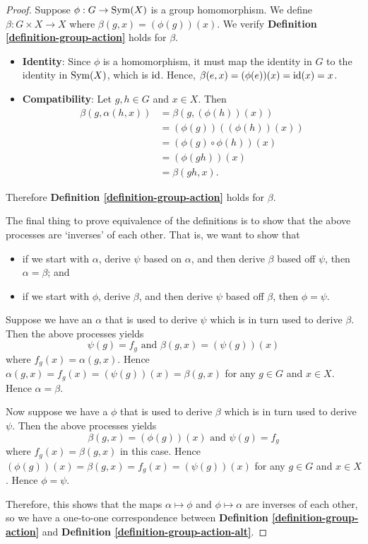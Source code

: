\begin{proof}
    Suppose $\phi: G \to \mathrm{Sym}(X)$ is a group homomorphism. We define $\beta: G \times X \to X$ where $\beta(g, x) = (\phi(g))(x)$. We verify \textbf{Definition \ref{definition-group-action}} holds for $\beta$.
    \begin{itemize}
        \item \textbf{Identity}: Since $\phi$ is a homomorphism, it must map the identity in $G$ to the identity in $\mathrm{Sym}(X)$, which is $\mathrm{id}$. Hence, $\beta(e, x) = (\phi(e))(x) = \mathrm{id}(x) = x$.
        \item \textbf{Compatibility}: Let $g, h \in G$ and $x \in X$. Then
        \begin{align*}
            \beta(g, \alpha(h, x)) &= \beta(g, (\phi(h))(x))\\
            &= (\phi(g))((\phi(h))(x))\\
            &= (\phi(g) \circ \phi(h))(x)\\
            &= (\phi(gh))(x)\\
            &= \beta(gh, x).
        \end{align*}
    \end{itemize}
    Therefore \textbf{Definition \ref{definition-group-action}} holds for $\beta$.

    The final thing to prove equivalence of the definitions is to show that the above processes are `inverses' of each other. That is, we want to show that
    \begin{itemize}
        \item if we start with $\alpha$, derive $\psi$ based on $\alpha$, and then derive $\beta$ based off $\psi$, then $\alpha = \beta$; and
        \item if we start with $\phi$, derive $\beta$, and then derive $\psi$ based off $\beta$, then $\phi = \psi$.
    \end{itemize}

    Suppose we have an $\alpha$ that is used to derive $\psi$ which is in turn used to derive $\beta$. Then the above processes yields
    \[
        \psi(g) = f_g \text{ and } \beta(g, x) = (\psi(g))(x)
    \]
    where $f_g(x) = \alpha(g, x)$. Hence $\alpha(g, x) = f_g(x) = (\psi(g))(x) = \beta(g, x)$ for any $g \in G$ and $x \in X$. Hence $\alpha = \beta$.

    Now suppose we have a $\phi$ that is used to derive $\beta$ which is in turn used to derive $\psi$. Then the above processes yields
    \[
        \beta(g, x) = (\phi(g))(x) \text{ and } \psi(g) = f_g
    \]
    where $f_g(x) = \beta(g, x)$ in this case. Hence $(\phi(g))(x) = \beta(g, x) = f_g(x) = (\psi(g))(x)$ for any $g \in G$ and $x \in X$. Hence $\phi = \psi$.

    Therefore, this shows that the maps $\alpha \mapsto \phi$ and $\phi \mapsto \alpha$ are inverses of each other, so we have a one-to-one correspondence between \textbf{Definition \ref{definition-group-action}} and \textbf{Definition \ref{definition-group-action-alt}}.
\end{proof}
